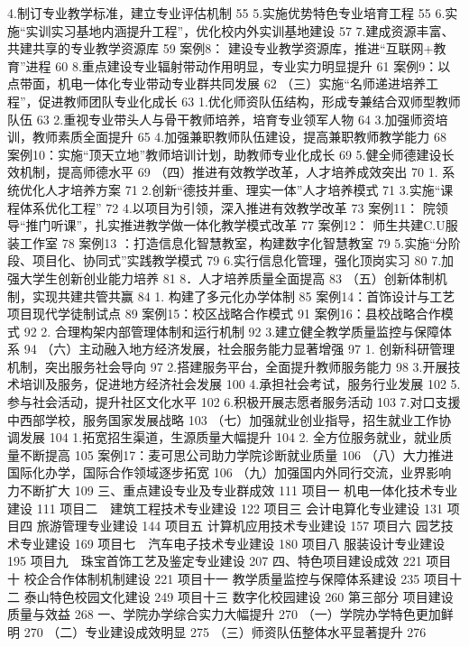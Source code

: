 4.制订专业教学标准，建立专业评估机制	55
5.实施优势特色专业培育工程	55
6.实施“实训实习基地内涵提升工程”，优化校内外实训基地建设	57
7.建成资源丰富、共建共享的专业教学资源库	59
案例8： 建设专业教学资源库，推进“互联网+教育”进程	60
8.重点建设专业辐射带动作用明显，专业实力明显提升	61
案例9：以点带面，机电一体化专业带动专业群共同发展	62
（三）实施“名师递进培养工程”，促进教师团队专业化成长	63
1.优化师资队伍结构，形成专兼结合双师型教师队伍	63
2.重视专业带头人与骨干教师培养，培育专业领军人物	64
3.加强师资培训，教师素质全面提升	65
4.加强兼职教师队伍建设，提高兼职教师教学能力	68
案例10：实施“顶天立地”教师培训计划，助教师专业化成长	69
5.健全师德建设长效机制，提高师德水平	69
（四）推进有效教学改革，人才培养成效突出	70
1. 系统优化人才培养方案	71
2.创新“德技并重、理实一体”人才培养模式	71
3.实施“课程体系优化工程”	72
4.以项目为引领，深入推进有效教学改革	73
案例11： 院领导“推门听课”，扎实推进教学做一体化教学模式改革	77
案例12： 师生共建C.U服装工作室	78
案例13 ：打造信息化智慧教室，构建数字化智慧教室	79
5.实施“分阶段、项目化、协同式”实践教学模式	79
6.实行信息化管理，强化顶岗实习	80
7.加强大学生创新创业能力培养	81
8．人才培养质量全面提高	83
（五）创新体制机制，实现共建共管共赢	84
1. 构建了多元化办学体制	85
案例14：首饰设计与工艺项目现代学徒制试点	89
案例15：校区战略合作模式	91
案例16：县校战略合作模式	92
2. 合理构架内部管理体制和运行机制	92
3.建立健全教学质量监控与保障体系	94
（六）主动融入地方经济发展，社会服务能力显著增强	97
1. 创新科研管理机制，突出服务社会导向	97
2.搭建服务平台，全面提升教师服务能力	98
3.开展技术培训及服务，促进地方经济社会发展	100
4.承担社会考试，服务行业发展	102
5.参与社会活动，提升社区文化水平	102
6.积极开展志愿者服务活动	103
7.对口支援中西部学校，服务国家发展战略	103
（七）加强就业创业指导，招生就业工作协调发展	104
1.拓宽招生渠道，生源质量大幅提升	104
2. 全方位服务就业，就业质量不断提高	105
案例17：麦可思公司助力学院诊断就业质量	106
（八）大力推进国际化办学，国际合作领域逐步拓宽	106
（九）加强国内外同行交流，业界影响力不断扩大	109
三、重点建设专业及专业群成效	111
项目一  机电一体化技术专业建设	111
项目二　建筑工程技术专业建设	122
项目三  会计电算化专业建设	131
项目四  旅游管理专业建设	144
项目五  计算机应用技术专业建设	157
项目六  园艺技术专业建设	169
项目七　汽车电子技术专业建设	180
项目八  服装设计专业建设	195
项目九　珠宝首饰工艺及鉴定专业建设	207
四、特色项目建设成效	221
项目十    校企合作体制机制建设	221
项目十一  教学质量监控与保障体系建设	235
项目十二  泰山特色校园文化建设	249
项目十三  数字化校园建设	260
第三部分   项目建设质量与效益	268
一、学院办学综合实力大幅提升	270
（一）学院办学特色更加鲜明	270
（二）专业建设成效明显	275
（三）师资队伍整体水平显著提升	276

